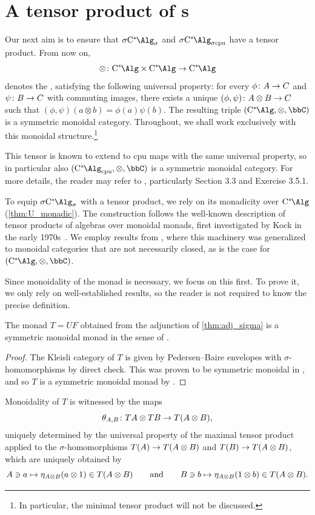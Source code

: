 \section{A tensor product of \texorpdfstring{\cstars{}s}{σC*-algebras}}\label{sec:tensor}

Our next aim is to ensure that $\SigmaC$ and $\SigmaCcpu$ have a tensor product.
From now on,
\[
	\otimes\colon \Calg \times \Calg \to \Calg
\]
denotes the , satisfying the following universal property: for every $\phi \colon {A} \to {C}$ and $\psi \colon {B} \to {C}$ with commuting images, there exists a unique $(\phi,\psi)\colon {A} \otimes {B} \to {C}$ such that $(\phi,\psi)(a\otimes b)= \phi(a)\psi(b)$.
The resulting triple $(\Calg,\otimes,\bbC)$ is a symmetric monoidal category.
Throughout, we shall work exclusively with this monoidal structure.\footnote{In particular, the minimal tensor product will not be discussed.}

This tensor is known to extend to cpu maps with the same universal property, so in particular also $(\Calgcpu,\otimes ,\bbC)$ is a symmetric monoidal category.
For more details, the reader may refer to \cite{brownozawa}, particularly Section 3.3 and Exercise 3.5.1.


To equip $\SigmaC$ with a tensor product, we rely on its monadicity over $\Calg$ (\cref{thm:U_monadic}). 
The construction follows the well-known description of tensor products of algebras over monoidal monads, first investigated by Kock in the early 1970s~\cite{Kock1970}.
We employ results from \cite{seal2013tensors}, where this machinery was generalized to monoidal categories that are not necessarily closed, as is the case for $(\Calg,\otimes,\bbC)$.

Since monoidality of the monad is necessary, we focus on this first.
To prove it, we only rely on well-established results, so the reader is not required to know the precise definition.
\begin{proposition}\label{prop:monoidalmonad}
	The monad $T=UF$ obtained from the adjunction of \autoref{thm:adj_sigma} is a symmetric monoidal monad in the sense of \cite{Kock1970}.
\end{proposition}

\begin{proof}
	The Kleisli category of $T$ is given by Pedersen--Baire envelopes with $\sigma$-homomorphisms by direct check.
	This was proven to be symmetric monoidal in \cite[Proposition 5.3.2]{fritz2025categories}, and so $T$ is a symmetric monoidal monad by \cite[Proposition 1.2.2]{seal2013tensors}.
\end{proof}
Monoidality of $T$ is witnessed by the maps
\[ \theta_{{A},{B}}\colon T{A} \otimes T{B} \to T({A}\otimes {B}),\]
uniquely determined by the universal property of the maximal tensor product applied to the $\sigma$-homomorphisms $T({A})\to T({A}\otimes B)$ and $T({B})\to T({A}\otimes {B})$, which are uniquely obtained by
\begin{equation*}%
	\A\owns a\mapsto \eta_{A\otimes B}(a\otimes 1) \in T(\A\otimes B)\qquad \text{and}\qquad \B \owns b\mapsto \eta_{A\otimes B}(1\otimes b) \in T(\A\otimes B).
\end{equation*}

